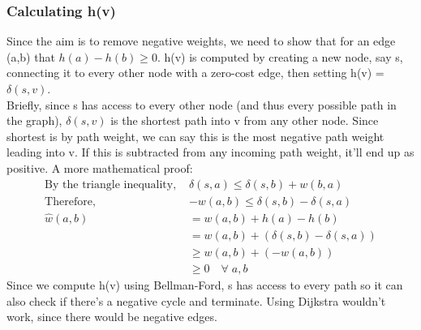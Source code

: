 \subsubsection{Calculating h(v)}
Since the aim is to remove negative weights, we need to show that for an edge (a,b) that \(h(a)-h(b) \geq 0\). h(v) is computed by creating a new node, say s, connecting it to every other node with a zero-cost edge, then setting h(v) = $\delta(s,v)$. \\
Briefly, since s has access to every other node (and thus every possible path in the graph), $\delta(s,v)$ is the shortest path into v from any other node. Since shortest is by path weight, we can say this is the most negative path weight leading into v. If this is subtracted from any incoming path weight, it'll end up as positive. A more mathematical proof:
\begin{align}
    \text{By the triangle inequality, }& \delta(s,a) \leq \delta(s,b) + w(b,a) \nonumber \\
    \text{Therefore, }&  -w(a,b) \leq  \nonumber \delta(s,b) - \delta(s,a) \\
    \hat{w}(a,b) &= w(a,b) + h(a) - h(b) \nonumber \\
                 &= w(a,b) + ( \delta(s,b) - \delta(s,a) ) \nonumber \\
                 &\geq w(a,b) + (-w(a,b)) \nonumber \\
                 &\geq 0 \quad \forall \; a,b \nonumber 
\end{align}
Since we compute h(v) using Bellman-Ford, s has access to every path so it can also check if there's a negative cycle and terminate. Using Dijkstra wouldn't work, since there would be negative edges.

